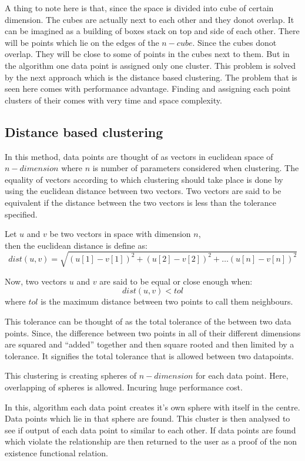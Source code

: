 A thing to note here is that, since the space is divided into cube of certain dimension. The cubes are actually next to each other and they donot overlap. It can be imagined as a building of boxes stack on top and side of each other. There will be points which lie on the edges of the \(n-cube\). Since the cubes donot overlap. They will be close to some of points in the cubes next to them. But in the algorithm one data point is assigned only one cluster. This problem is solved by the next approach which is the distance based clustering. The problem that is seen here comes with performance advantage. Finding and assigning each point clusters of their comes with very time and space complexity.

\subsection{Distance based clustering}

In this method, data points are thought of as vectors in euclidean space of \(n-dimension\) where \(n\) is number of parameters considered when clustering. The equality of vectors according to which clustering should take place is done by using the euclidean distance between two vectors. Two vectors are said to be equivalent if the distance between the two vectors is less than the tolerance specified.

Let \(u\) and \(v\) be two vectors in space with dimension \(n\),\\
then the euclidean distance is define as: \\
\[dist(u, v) = \sqrt{(u[1] - v[1])^2 + (u[2] - v[2])^2 + \ldots (u[n] - v[n])^2}\]

Now, two vectors \(u\) and \(v\) are said to be equal or close enough when:\\
\[dist(u,v) < tol\]  where \(tol\) is the maximum distance between two points to call them neighbours.

This tolerance can be thought of as the total tolerance of the between two data points. Since, the difference between two points in all of their different dimensions are squared and ``added'' together and then square rooted and then limited by a tolerance. It signifies the total tolerance that is allowed between two datapoints. 

This clustering is creating spheres of \(n-dimension\) for each data point. Here, overlapping of spheres is allowed. Incuring huge performance cost.

In this, algorithm each data point creates it's own sphere with itself in the centre. Data points which lie in that sphere are found. This cluster is then analysed to see if output of each data point to similar to each other. If data points are found which violate the relationship are then returned to the user as a proof of the non existence functional relation.

